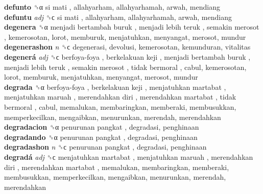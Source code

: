 \textbf{defunto} ␝α   si mati , allahyarham, allahyarhamah, arwah, mendiang  \\
\textbf{defuntu} \emph{adj}  ␝ϲ   si mati , allahyarham, allahyarhamah, arwah, mendiang  \\
\textbf{degenera} ␝α   menjadi bertambah buruk ,  menjadi lebih teruk ,  semakin merosot , kemerosotan, lorot, memburuk, menjatuhkan, menyangat, merosot, mundur  \\
\textbf{degenerashon} \emph{n}  ␝ϲ  degenerasi, devolusi, kemerosotan, kemunduran, vitalitas  \\
\textbf{degenerá} \emph{adj}  ␝ϲ   berfoya-foya ,  berkelakuan keji ,  menjadi bertambah buruk ,  menjadi lebih teruk ,  semakin merosot ,  tidak bermoral , cabul, kemerosotan, lorot, memburuk, menjatuhkan, menyangat, merosot, mundur  \\
\textbf{degrada} ␝α   berfoya-foya ,  berkelakuan keji ,  menjatuhkan martabat ,  menjatuhkan maruah ,  merendahkan diri ,  merendahkan martabat ,  tidak bermoral , cabul, memalukan, membaringkan, memberaki, membusukkan, memperkecilkan, mengaibkan, menurunkan, merendah, merendahkan  \\
\textbf{degradacion} ␝α   penurunan pangkat , degradasi, penghinaan  \\
\textbf{degradando} ␝α   penurunan pangkat , degradasi, penghinaan  \\
\textbf{degradashon} \emph{n}  ␝ϲ   penurunan pangkat , degradasi, penghinaan  \\
\textbf{degradá} \emph{adj}  ␝ϲ   menjatuhkan martabat ,  menjatuhkan maruah ,  merendahkan diri ,  merendahkan martabat , memalukan, membaringkan, memberaki, membusukkan, memperkecilkan, mengaibkan, menurunkan, merendah, merendahkan  \\
